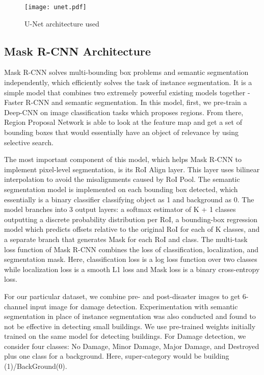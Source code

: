 \documentclass[conference]{IEEEtran}
\begin{document}
\begin{figure}[h!]
\centering\texttt{[image: unet.pdf]}
\caption{U-Net architecture used}
\label{fig:unet}
\end{figure}

\subsection{Mask R-CNN Architecture}
Mask R-CNN\cite{a18} solves multi-bounding box problems and semantic segmentation independently, which efficiently solves the task of instance segmentation. It is a simple model that combines two extremely powerful existing models together - Faster R-CNN and semantic segmentation. In this model, first, we pre-train a Deep-CNN on image classification tasks which proposes regions. From there, Region Proposal Network is able to look at the feature map and get a set of bounding boxes that would essentially have an object of relevance by using selective search. 

The most important component of this model, which helps Mask R-CNN to implement pixel-level segmentation, is its RoI Align layer. This layer uses bilinear interpolation to avoid the misalignments caused by RoI Pool. The semantic segmentation model is implemented on each bounding box detected, which essentially is a binary classifier classifying object as 1 and background as 0. The model branches into 3 output layers: a softmax estimator of K + 1 classes outputting a discrete probability distribution per RoI, a bounding-box regression model which predicts offsets relative to the original RoI for each of K classes, and a separate branch that generates Mask for each RoI and class. The multi-task loss function of Mask R-CNN combines the loss of classification, localization, and segmentation mask. Here, classification loss is a log loss function over two classes while localization loss is a  smooth L1 loss and  Mask loss is a binary cross-entropy loss.

For our particular dataset, we combine pre- and post-disaster images to get 6-channel input image for damage detection. Experimentation with semantic segmentation in place of instance segmentation was also conducted and found to not be effective in detecting small buildings. We use pre-trained weights initially trained on the same model for detecting buildings. For Damage detection, we consider four classes: No Damage, Minor Damage, Major Damage, and Destroyed plus one class for a background. Here, super-category would be building (1)/BackGround(0).
\end{document}
